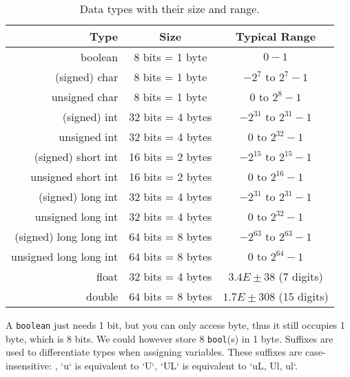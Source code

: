 \begin{table}[htb!]
	\centering
	\begin{tabular}{rcc}
		\textbf{Type}          & \textbf{Size}     & \textbf{Typical Range}   \\
		\hline\hline
		boolean                & 8 bits = 1 byte   & $0-1$                    \\
		(signed) char          & 8 bits = 1 byte   & $-2^7$ to $2^7-1$        \\
		unsigned char          & 8 bits = 1 byte   & $0$ to $2^8-1$           \\
		(signed) int           & 32 bits = 4 bytes & $-2^{31}$ to $2^{31}-1$  \\
		unsigned int           & 32 bits = 4 bytes & $0$ to $2^{32}-1$        \\
		(signed) short int     & 16 bits = 2 bytes & $-2^{15}$ to $2^{15}-1$  \\
		unsigned short int     & 16 bits = 2 bytes & $0$ to $2^{16}-1$        \\
		(signed) long int      & 32 bits = 4 bytes & $-2^{31}$ to $2^{31}-1$  \\
		unsigned long int      & 32 bits = 4 bytes & $0$ to $2^{32}-1$        \\
		(signed) long long int & 64 bits = 8 bytes & $-2^{63}$ to $2^{63}-1$  \\
		unsigned long long int & 64 bits = 8 bytes & $0$ to $2^{64}-1$        \\
		float                   & 32 bits = 4 bytes & $3.4E\pm38$ (7 digits)   \\
		double                 & 64 bits = 8 bytes & $1.7E\pm308$ (15 digits)
	\end{tabular}
	\caption{Data types with their size and range.}
\end{table}

A \verb|boolean| just needs 1 bit, but you can only access byte, thus it still occupies 1 byte, which is 8 bits. We could however store 8 \verb|bool|(s) in 1 byte. Suffixes are used to differentiate types when assigning variables. These suffixes are case-insensitive: \ie, `u` is equivalent to `U`, `UL` is equivalent to `uL, Ul, ul`.

